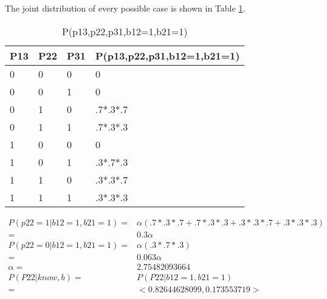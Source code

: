 \documentclass[12pt]{article}
\begin{document}
The joint distribution of every possible case is shown in Table \ref{tab:wumpus}.
\begin{table}
  \centering
  \begin{tabularx}{\textwidth}{|X|X|X|l|} \hline
    P13 & P22 & P31 & P(p13,p22,p31,b12=1,b21=1) \\ \hline
    0 & 0 & 0 & 0 \\ \hline
    0 & 0 & 1 & 0 \\ \hline
    0 & 1 & 0 & .7*.3*.7 \\ \hline
    0 & 1 & 1 & .7*.3*.3 \\ \hline
    1 & 0 & 0 & 0 \\ \hline
    1 & 0 & 1 & .3*.7*.3 \\ \hline
    1 & 1 & 0 & .3*.3*.7 \\ \hline
    1 & 1 & 1 & .3*.3*.3 \\ \hline
  \end{tabularx}
  \caption{P(p13,p22,p31,b12=1,b21=1)}
  \label{tab:wumpus}
\end{table}
\begin{align*}
  P(p22=1|b12=1,b21=1)
  =& \alpha (.7*.3*.7+.7*.3*.3+.3*.3*.7+.3*.3*.3) \\
  =& 0.3 \alpha \\
  P(p22=0|b12=1,b21=1)
  =& \alpha (.3*.7*.3) \\
  =& 0.063 \alpha \\
  \alpha =& 2.75482093664 \\
  P(P22|know,b)
  =& P(P22|b12=1,b21=1)\\
  =& <0.82644628099,0.173553719>\\
\end{align*}
\end{document}

